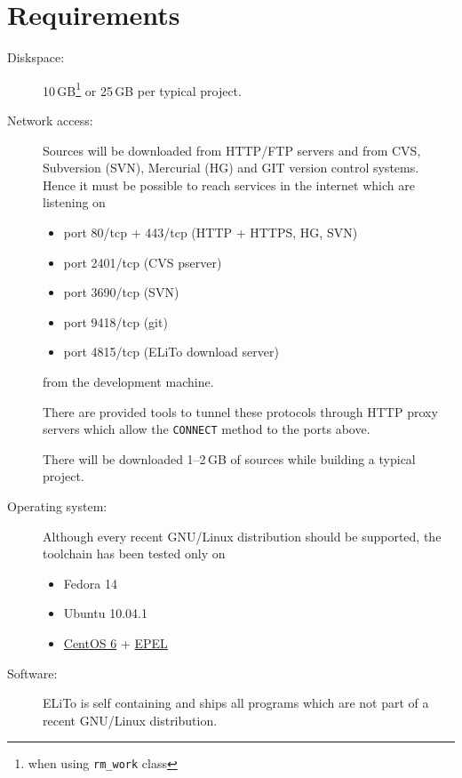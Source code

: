\chapter{Requirements}
\label{chap:reqs}

\begin{description}
\item[Diskspace:] 10\,GB\footnote{when using \texttt{rm\_work} class}
  or 25\,GB per typical project.
\item[Network access:] Sources will be downloaded from HTTP/FTP
  servers and from CVS, Subversion (SVN), Mercurial (HG) and GIT
  version control systems. Hence it must be possible to reach services
  in the internet which are listening on
  \begin{itemize}
  \item port 80/tcp + 443/tcp  (HTTP + HTTPS, HG, SVN)
  \item port 2401/tcp (CVS pserver)
  \item port 3690/tcp (SVN)
  \item port 9418/tcp (git)
  \item port 4815/tcp (ELiTo download server)
  \end{itemize}
  from the development machine.

  There are provided tools to tunnel these protocols through HTTP
  proxy servers which allow the \texttt{CONNECT} method to the ports
  above.

  There will be downloaded 1--2\,GB of sources while building a
  typical project.
\item[Operating system:] Although every recent GNU/Linux distribution
  should be supported, the toolchain has been tested only on
  \begin{itemize}
  \item Fedora 14
  \item Ubuntu 10.04.1
  \item \href{http://centos.org}{CentOS 6} +
    \href{https://fedoraproject.org/wiki/EPEL}{EPEL}
  \end{itemize}
\item[Software:] ELiTo is self containing and ships all programs which
  are not part of a recent GNU/Linux distribution.
\end{description}
